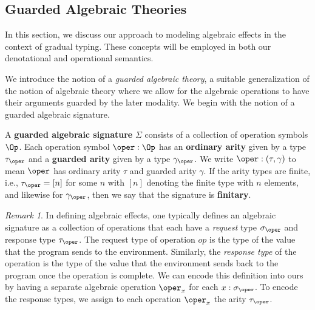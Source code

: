 \documentclass[acmsmall,screen,review,anonymous]{acmart}
\theoremstyle{remark}
\newtheorem{remark}{Remark}
\begin{document}

\subsection{Guarded Algebraic Theories}\label{sec:guarded-algebraic-theories}

In this section, we discuss our approach to modeling algebraic effects in the
context of gradual typing. These concepts will be employed in both our
denotational and operational semantics.

We introduce the notion of a \emph{guarded algebraic theory}, a suitable
generalization of the notion of algebraic theory where we allow for the
algebraic operations to have their arguments guarded by the later modality. We
begin with the notion of a guarded algebraic signature.

A \textbf{guarded algebraic signature} $\Sigma$ consists of a collection of
operation symbols $\Op$. Each operation symbol $\oper : \Op$ has an
\textbf{ordinary arity} given by a type $\tau_\oper$ and a \textbf{guarded
arity} given by a type $\gamma_\oper$. We write $\oper : (\tau, \gamma)$ to mean
$\oper$ has ordinary arity $\tau$ and guarded arity $\gamma$.
%
If the arity types are finite, i.e., $\tau_\oper = [n]$ for some $n$ with $[n]$
denoting the finite type with $n$ elements, and likewise for $\gamma_\oper$,
then we say that the signature is \textbf{finitary}.

\begin{remark}
  In defining algebraic effects, one typically defines an algebraic signature as
  a collection of operations that each have a \emph{request} type $\sigma_\oper$
  and response type $\tau_\oper$. The request type of operation $op$ is the type
  of the value that the program sends to the environment. Similarly, the
  \emph{response type} of the operation is the type of the value that the
  environment sends back to the program once the operation is complete. We can
  encode this definition into ours by having a separate algebraic operation
  $\oper_x$ for each $x : \sigma_\oper$. To encode the response types, we assign
  to each operation $\oper_x$ the arity $\tau_\oper$. 
\end{remark} 
\end{document}
